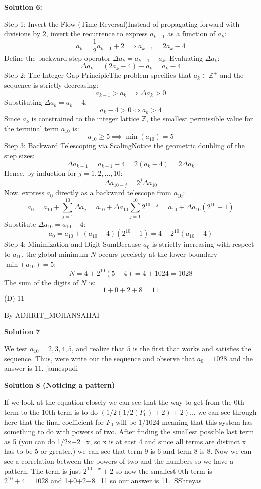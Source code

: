 \begin{enumerate}
 



\textbf{Solution 6:}

Step 1: Invert the Flow (Time-Reversal)Instead of propagating forward with divisions by $2$, invert the recurrence to express $a_{k-1}$ as a function of $a_k$:
 \[a_k = \frac{1}{2}a_{k-1} + 2 \implies a_{k-1} = 2a_k - 4\]Define the backward step operator $\Delta a_k = a_{k-1} - a_k$. Evaluating $\Delta a_k$:
 \[\Delta a_k = (2a_k - 4) - a_k = a_k - 4\]Step 2: The Integer Gap PrincipleThe problem specifies that $a_k \in \mathbb{Z}^+$ and the sequence is strictly decreasing:
 \[a_{k-1} > a_k \implies \Delta a_k > 0\]Substituting $\Delta a_k = a_k - 4$:
 \[a_k - 4 > 0 \iff a_k > 4\]Since $a_k$ is constrained to the integer lattice $\mathbb{Z}$, the smallest permissible value for the terminal term $a_{10}$ is:
 \[a_{10} \ge 5 \implies \min(a_{10}) = 5\]Step 3: Backward Telescoping via ScalingNotice the geometric doubling of the step sizes:
 \[\Delta a_{k-1} = a_{k-1} - 4 = 2(a_k - 4) = 2 \Delta a_k\]Hence, by induction for $j = 1, 2, \dots, 10$:
 \[\Delta a_{10 - j} = 2^j \Delta a_{10}\]Now, express $a_0$ directly as a backward telescope from $a_{10}$:
 \[a_0 = a_{10} + \sum_{j=1}^{10} \Delta a_j = a_{10} + \Delta a_{10} \sum_{j=1}^{10} 2^{10-j} = a_{10} + \Delta a_{10} (2^{10} - 1)\]Substitute $\Delta a_{10} = a_{10} - 4$:
 \[a_0 = a_{10} + (a_{10} - 4)(2^{10} - 1) = 4 + 2^{10}(a_{10} - 4)\]Step 4: Minimization and Digit SumBecause $a_0$ is strictly increasing with respect to $a_{10}$, the global minimum $N$ occurs precisely at the lower boundary $\min(a_{10}) = 5$:
 \[N = 4 + 2^{10}(5 - 4) = 4 + 1024 = 1028\]The sum of the digits of $N$ is:
 \[1 + 0 + 2 + 8 = 11\](D) 11

 By-ADHRIT\_MOHANSAHAI

 



\textbf{Solution 7}

We test $a _ {10} = 2, 3, 4, 5$, and realize that $5$ is the first that works and satisfies the sequence. Thus, were write out the sequence and observe that $a_0=1028$ and the answer is $\boxed{11}$.~jamespudi

 



\textbf{Solution 8 (Noticing a pattern)}

If we look at the equation closely we can see that the way to get from the 0th term to the 10th term is to do $(1/2(1/2(F_0)+2)+2) ...$ we can see through here that the final coefficient for $F_0$ will be $1/1024$ meaning that this system has something to do with powers of two. After finding the smallest possible last term as 5 (you can do 1/2x+2=x, so x is at east 4 and since all terms are distinct x has to be 5 or greater.) we can see that term 9 is 6 and term 8 is 8. Now we can see a correlation between the powers of two and the numbers so we have a pattern. The term is just $2^{10-x}+2$ so now the smallest 0th term is $2^{10}+4=1028$ and 1+0+2+8=11 so our answer is 11.~SShreyas


\end{enumerate}
